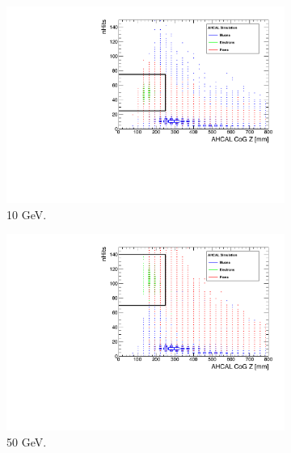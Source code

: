 \begin{figure}[htbp!]
\begin{subfigure}[t]{0.45\textwidth}
		\includegraphics[width=1\linewidth]{chap5/fig_AHCAL_timing/Electrons/SelectionCut_nHitsCoGZ_10GeV}
		\caption{10 GeV.} \label{fig:e10GeV_nHitsCoGZ}
	\end{subfigure}
	\hfill
	\begin{subfigure}[t]{0.45\textwidth}
		\centering
		\includegraphics[width=1\linewidth]{chap5/fig_AHCAL_timing/Electrons/SelectionCut_nHitsCoGZ_50GeV}
		\caption{50 GeV.} \label{fig:e50GeV_nHitsCoGZ}
	\end{subfigure}
	\hfill
	\begin{subfigure}[t]{0.45\textwidth}
		\centering

\end{subfigure}
\end{figure}
